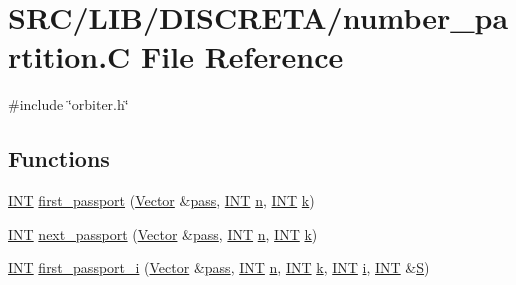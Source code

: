 \hypertarget{number__partition_8_c}{}\section{S\+R\+C/\+L\+I\+B/\+D\+I\+S\+C\+R\+E\+T\+A/number\+\_\+partition.C File Reference}
\label{number__partition_8_c}
{\ttfamily \#include \char`\"{}orbiter.\+h\char`\"{}}\newline
\subsection*{Functions}
\begin{DoxyCompactItemize}
\item 
\mbox{\hyperlink{galois_8h_a09fddde158a3a20bd2dcadb609de11dc}{I\+NT}} \mbox{\hyperlink{number__partition_8_c_a8e5f1fd6e29a944ed7eea797ad23d1c8}{first\+\_\+passport}} (\mbox{\hyperlink{class_vector}{Vector}} \&\mbox{\hyperlink{clique__finder_8_c_aba24b5be3d3e0e4b86665c305ee69e1c}{pass}}, \mbox{\hyperlink{galois_8h_a09fddde158a3a20bd2dcadb609de11dc}{I\+NT}} \mbox{\hyperlink{simeon_8_c_a7f2cd26777ce0ff3fdaf8d02aacbddfb}{n}}, \mbox{\hyperlink{galois_8h_a09fddde158a3a20bd2dcadb609de11dc}{I\+NT}} \mbox{\hyperlink{simeon_8_c_a43fa990200c3ddd47c35f151bd4d66bf}{k}})
\item 
\mbox{\hyperlink{galois_8h_a09fddde158a3a20bd2dcadb609de11dc}{I\+NT}} \mbox{\hyperlink{number__partition_8_c_aa1dae9a588e3f2fb6c230a5a4d338d9f}{next\+\_\+passport}} (\mbox{\hyperlink{class_vector}{Vector}} \&\mbox{\hyperlink{clique__finder_8_c_aba24b5be3d3e0e4b86665c305ee69e1c}{pass}}, \mbox{\hyperlink{galois_8h_a09fddde158a3a20bd2dcadb609de11dc}{I\+NT}} \mbox{\hyperlink{simeon_8_c_a7f2cd26777ce0ff3fdaf8d02aacbddfb}{n}}, \mbox{\hyperlink{galois_8h_a09fddde158a3a20bd2dcadb609de11dc}{I\+NT}} \mbox{\hyperlink{simeon_8_c_a43fa990200c3ddd47c35f151bd4d66bf}{k}})
\item 
\mbox{\hyperlink{galois_8h_a09fddde158a3a20bd2dcadb609de11dc}{I\+NT}} \mbox{\hyperlink{number__partition_8_c_a55d261ef239bdfff783bd501afa5f37f}{first\+\_\+passport\+\_\+i}} (\mbox{\hyperlink{class_vector}{Vector}} \&\mbox{\hyperlink{clique__finder_8_c_aba24b5be3d3e0e4b86665c305ee69e1c}{pass}}, \mbox{\hyperlink{galois_8h_a09fddde158a3a20bd2dcadb609de11dc}{I\+NT}} \mbox{\hyperlink{simeon_8_c_a7f2cd26777ce0ff3fdaf8d02aacbddfb}{n}}, \mbox{\hyperlink{galois_8h_a09fddde158a3a20bd2dcadb609de11dc}{I\+NT}} \mbox{\hyperlink{simeon_8_c_a43fa990200c3ddd47c35f151bd4d66bf}{k}}, \mbox{\hyperlink{galois_8h_a09fddde158a3a20bd2dcadb609de11dc}{I\+NT}} \mbox{\hyperlink{alphabet2_8_c_acb559820d9ca11295b4500f179ef6392}{i}}, \mbox{\hyperlink{galois_8h_a09fddde158a3a20bd2dcadb609de11dc}{I\+NT}} \&\mbox{\hyperlink{simeon_8_c_adab47f8243f1b5a2c31df2535d6b37d0}{S}})

\end{DoxyCompactItemize}
